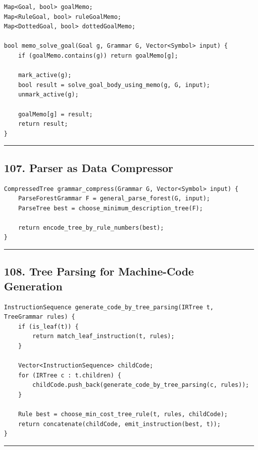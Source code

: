 \documentclass[10pt,letterpaper]{article}
\begin{document}
\begin{verbatim}
Map<Goal, bool> goalMemo;
Map<RuleGoal, bool> ruleGoalMemo;
Map<DottedGoal, bool> dottedGoalMemo;

bool memo_solve_goal(Goal g, Grammar G, Vector<Symbol> input) {
    if (goalMemo.contains(g)) return goalMemo[g];

    mark_active(g);
    bool result = solve_goal_body_using_memo(g, G, input);
    unmark_active(g);

    goalMemo[g] = result;
    return result;
}
\end{verbatim}

\medskip\hrule\medskip

\subsection*{107. Parser as Data Compressor}

\begin{verbatim}
CompressedTree grammar_compress(Grammar G, Vector<Symbol> input) {
    ParseForestGrammar F = general_parse_forest(G, input);
    ParseTree best = choose_minimum_description_tree(F);

    return encode_tree_by_rule_numbers(best);
}
\end{verbatim}

\medskip\hrule\medskip

\subsection*{108. Tree Parsing for Machine-Code Generation}

\begin{verbatim}
InstructionSequence generate_code_by_tree_parsing(IRTree t, TreeGrammar rules) {
    if (is_leaf(t)) {
        return match_leaf_instruction(t, rules);
    }

    Vector<InstructionSequence> childCode;
    for (IRTree c : t.children) {
        childCode.push_back(generate_code_by_tree_parsing(c, rules));
    }

    Rule best = choose_min_cost_tree_rule(t, rules, childCode);
    return concatenate(childCode, emit_instruction(best, t));
}
\end{verbatim}

\medskip\hrule\medskip
\end{document}
